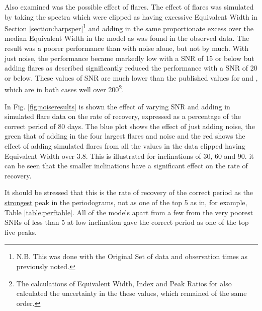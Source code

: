 Also examined was the possible effect of flares. The effect of flares was simulated by taking the spectra
which were clipped as having excessive Equivalent Width in Section \ref{section:harpsper}\footnote{N.B. This was done
  with the Original Set of data and observation times as previously noted.} and adding in the same
proportionate excess over the median Equivalent Width in the model as was found in the observed data. The result was a
poorer performance than with noise alone, but not by much. With just noise, the performance became markedly low with a
SNR of 15 or below but adding flares as described significantly reduced the performance with a SNR of 20 or below. These
values of SNR are much lower than the published values for {\uves} and {\harps}, which are in both cases well over
200\footnote{The calculations of Equivalent Width, {\ha} Index and Peak Ratios for {\harps} also calculated the
  uncertainty in the these values, which remained of the same order.}.

In Fig. \ref{fig:noiseresults} is shown the effect of varying SNR and adding in simulated flare data on the rate of
recovery, expressed as a percentage of the correct period of 80 days. The blue plot shows the effect of just adding
noise, the green that of adding in the four largest flares and noise and the red shows the effect of adding simulated
flares from all the values in the {\harps} data clipped having Equivalent Width over 3.8. This is illustrated for
inclinations of 30{\degree}, 60{\degree} and 90{\degree}. it can be seen that the smaller inclinations have a
significant effect on the rate of recovery.

It should be stressed that this is the rate of recovery of the correct period as the \underline{strongest} peak in the
periodograms, not as one of the top 5 as in, for example, Table \ref{table:perftable}. All of the models apart from a
few from the very poorest SNRs of less than 5 at low inclination gave the correct period as one of the top five peaks.

